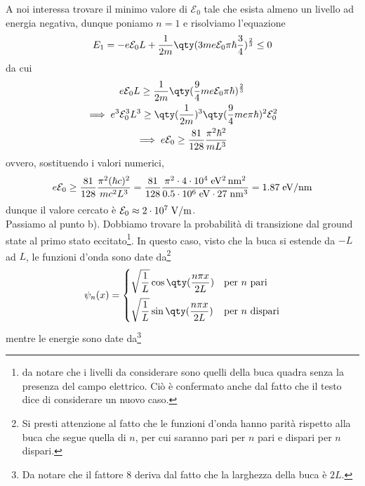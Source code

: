 \begin{soluzione}
   A noi interessa trovare il minimo valore di $\mathcal{E}_0$ tale che esista almeno un livello ad energia negativa, dunque poniamo $n=1$ e risolviamo l'equazione
   \begin{equation*}
      E_1
      =- e \mathcal{E}_0 L + \frac{1}{2m} \qty( 3 m e \mathcal{E}_0 \pi \hbar \frac{3}{4} )^{\frac{2}{3}}
      \leq 0
   \end{equation*}
   da cui
   \begin{gather*}
      e \mathcal{E}_0 L
      \geq \frac{1}{2m} \qty( \frac{9}{4} m e \mathcal{E}_0 \pi \hbar )^{\frac{2}{3}}
      \\
      \implies
      e^3 \mathcal{E}_0^3 L^3
      \geq \qty( \frac{1}{2m} )^3 \qty( \frac{9}{4} m e \pi \hbar )^{2} \mathcal{E}_0^2
      \\
      \implies
      e \mathcal{E}_0
      \geq \frac{81}{128} \frac{\pi^2 \hbar^2}{m L^3}
   \end{gather*}
   ovvero, sostituendo i valori numerici,
   \begin{equation*}
      e \mathcal{E}_0
      \geq \frac{81}{128} \frac{\pi^2 (\hbar c)^2}{m c^2 L^3}
      =\frac{81}{128} \frac{\pi^2 \cdot 4 \cdot 10^4 \; \rm eV^2 \, \rm nm^2}{0.5 \cdot 10^6 \; \rm eV \cdot 27 \; \rm nm^3}
      = 1.87 \; \rm eV/\rm nm
   \end{equation*}
   dunque il valore cercato è $\mathcal{E}_0 \approx 2 \cdot 10^7 \; \rm V/m$.\\
   Passiamo al punto b). Dobbiamo trovare la probabilità di transizione dal ground state al primo stato eccitato\footnote{\E da notare che i livelli da considerare sono quelli della buca quadra senza la presenza del campo elettrico. Ciò è confermato anche dal fatto che il testo dice di considerare un nuovo caso.}. In questo caso, visto che la buca si estende da $-L$ ad $L$, le funzioni d'onda sono date da\footnote{Si presti attenzione al fatto che le funzioni d'onda hanno parità rispetto alla buca che segue quella di $n$, per cui saranno pari per $n$ pari e dispari per $n$ dispari.}
   \begin{equation*}
      \psi_n(x)
      =
      \begin{cases}
         \displaystyle \sqrt{\frac{1}{L}}\cos{ \qty( \frac{n \pi x}{2L} ) } & \text{per $n$ pari}\\[0.3cm]
         \displaystyle \sqrt{\frac{1}{L}}\sin{ \qty( \frac{n \pi x}{2L} ) } & \text{per $n$ dispari}
      \end{cases}
   \end{equation*}
   mentre le energie sono date da\footnote{Da notare che il fattore $8$ deriva dal fatto che la larghezza della buca è $2L$.}

\end{soluzione}

